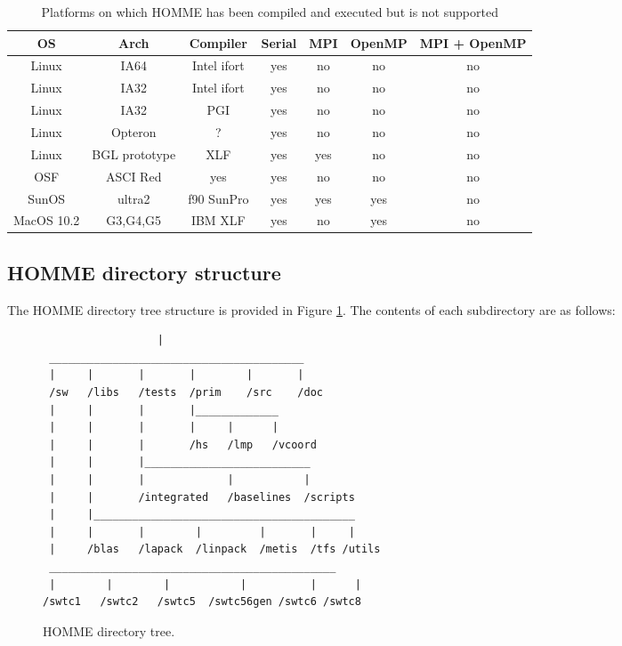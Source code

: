 \documentclass[12pt]{article}
\numberwithin{equation}{section}
\begin{document}
\begin{table}[bht]
\begin{center}

\end{center}
\begin{tabular}{|c|c|c|c|c|c|c|} \hline
OS & Arch & Compiler & Serial & MPI & OpenMP &  MPI + OpenMP \\ \hline \hline
Linux & IA64 & Intel ifort         & yes         & no & no        & no \\ \hline
Linux & IA32 & Intel ifort         & yes         & no & no        & no \\ \hline
Linux & IA32 & PGI                  & yes         & no & no   & no \\ \hline
Linux & Opteron & ? & yes & no & no & no \\ \hline
Linux & BGL prototype & XLF & yes & yes & no & no \\ \hline
OSF   &  ASCI Red & yes & yes & no & no & no \\ \hline
SunOS & ultra2 & f90 SunPro & yes & yes  & yes           & no \\ \hline
MacOS 10.2 & G3,G4,G5 & IBM XLF & yes & no & yes & no \\ \hline \hline
\end{tabular}
\caption{Platforms on which HOMME has been compiled and executed but is not supported}
\label{tbl:UnsupportedMachConfig}
\end{table}

 
\subsection{HOMME directory structure}					%

The HOMME directory tree structure is provided in Figure \ref{fig:dirTree}.  The contents of each subdirectory are as follows: 
\begin{figure}
\begin{center}
\begin{verbatim}
                  |
 ________________________________________
 |     |       |       |        |       |
 /sw   /libs   /tests  /prim    /src    /doc	
 |     |       |       |_____________
 |     |       |       |     |      | 
 |     |       |       /hs   /lmp   /vcoord
 |     |       |__________________________
 |     |       |             |           |
 |     |       /integrated   /baselines  /scripts  
 |     |_________________________________________
 |     |       |        |         |       |     |
 |     /blas   /lapack  /linpack  /metis  /tfs /utils
 _____________________________________________
 |        |	       |	  	   |          |	     |
/swtc1   /swtc2   /swtc5  /swtc56gen /swtc6 /swtc8
\end{verbatim}
\end{center}
\caption{HOMME directory tree.} 
\label{fig:dirTree}
\end{figure}
\end{document}
